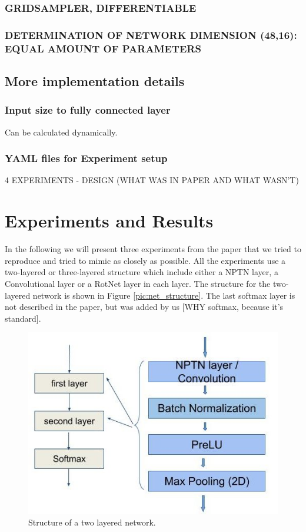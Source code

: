 \documentclass{llncs}
\begin{document}
\subsubsection{GRIDSAMPLER, DIFFERENTIABLE}
\subsubsection{DETERMINATION OF NETWORK DIMENSION (48,16): EQUAL AMOUNT OF PARAMETERS}

\subsection{More implementation details}
\subsubsection{Input size to fully connected layer}
Can be calculated dynamically.
\subsubsection{YAML files for Experiment setup}

4 EXPERIMENTS
- DESIGN (WHAT WAS IN PAPER AND WHAT WASN'T)



\section{Experiments and Results}	
In the following we will present three experiments from the paper that we tried to reproduce and tried to mimic as closely as possible. 
All the experiments use a two-layered or three-layered structure which include either a NPTN layer, a Convolutional layer or a RotNet layer in each layer. The structure for the two-layered network is shown in Figure \ref{pic:net_structure}. The last softmax layer is not described in the paper, but was added by us [WHY softmax, because it's standard]. 

\begin{figure}
	\begin{center}
	\includegraphics[scale=0.35]{result_images/network_structure.jpg}
	\caption{Structure of a two layered network.}
	\label{pic:network_structure}
	\end{center}
\end{figure}
\end{document}
